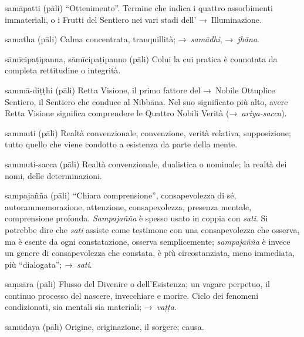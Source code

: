 \begin{glossarydescription}
\item[samāpatti] (pāli) ``Ottenimento''. Termine che indica i quattro
  assorbimenti immateriali, o i Frutti del Sentiero nei vari stadi dell'
  →~Illuminazione.

\item[samatha] (pāli) Calma concentrata, tranquillità; →~\emph{samādhi},
  →~\emph{jhāna}.

\item[sāmīcipaṭipanna, sāmīcipaṭipanno] (pāli) Colui la cui pratica è connotata
  da completa rettitudine o integrità.

\item[sammā-diṭṭhi] (pāli) Retta Visione, il primo fattore del →~Nobile
  Ottuplice Sentiero, il Sentiero che conduce al Nibbāna. Nel suo
  significato più alto, avere Retta Visione significa comprendere le Quattro
  Nobili Verità (→~\emph{ariya-sacca}).

\item[sammuti] (pāli) Realtà convenzionale, convenzione, verità relativa,
  supposizione; tutto quello che viene condotto a esistenza da parte della
  mente.

\item[sammuti-sacca] (pāli) Realtà convenzionale, dualistica o nominale; la
  realtà dei nomi, delle determinazioni.

\item[sampajañña] (pāli) ``Chiara comprensione'', consapevolezza di sé,
  autorammemorazione, attenzione, consapevolezza, presenza mentale, comprensione
  profonda. \emph{Sampajañña} è spesso usato in coppia con \emph{sati}. Si
  potrebbe dire che \emph{sati} assiste come testimone con una consapevolezza
  che osserva, ma è esente da ogni constatazione, osserva semplicemente;
  \emph{sampajañña} è invece un genere di consapevolezza che constata, è più
  circostanziata, meno immediata, più ``dialogata''; →~\emph{sati}.

\item[saṃsāra] (pāli) Flusso del Divenire o dell'Esistenza; un vagare perpetuo,
  il continuo processo del nascere, invecchiare e morire. Ciclo dei fenomeni
  condizionati, sia mentali sia materiali; →~\emph{vaṭṭa}.

\item[samudaya] (pāli) Origine, originazione, il sorgere; causa.


\end{glossarydescription}

